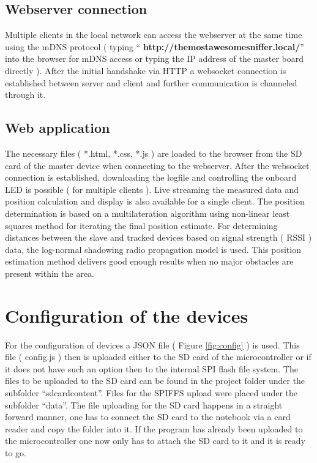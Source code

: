 \documentclass[11pt,a4paper]{article}
\begin{document}
\onecolumn

\subsection{Webserver connection}
Multiple clients in the local network can access the webserver at the same time using the mDNS protocol ( typing ``{\selectfont
\textbf{http://themostawesomesniffer.local/}}'' into the browser for mDNS access or typing the IP address of the master board directly ). After the initial handshake via HTTP a websocket connection is established between server and client and further communication is channeled through it. 

\subsection{Web application}
The necessary files ( *.html, *.css, *.js ) are loaded to the browser from the SD card of the master device when connecting to the webserver. After the websocket connection is established, downloading the logfile and controlling the onboard LED is possible ( for multiple clients ). Live streaming the measured data and position calculation and display is also available for a single client. The position determination is based on a multilateration algorithm using non-linear least squares method for iterating the final position estimate. For determining distances between the slave and tracked devices based on signal strength ( RSSI ) data, the log-normal shadowing radio propagation model is used. This position estimation method delivers good enough results when no major obstacles are present within the area.


\section{Configuration of the devices}

For the configuration of devices a JSON file ( Figure \ref{fig:config} ) is used. This file ( config.js ) then is uploaded either to the SD card of the microcontroller or if it does not have such an option then to the internal SPI flash file system. The files to be uploaded to the SD card can be found in the project folder under the subfolder ``sdcardcontent''. Files for the SPIFFS upload were placed under the subfolder ``data''. The file uploading for the SD card happens in a straight forward manner, one has to connect the SD card to the notebook via a card reader and copy the folder into it. If the program has already been uploaded to the microcontroller one now only has to attach the SD card to it and it is ready to go.
\end{document}
